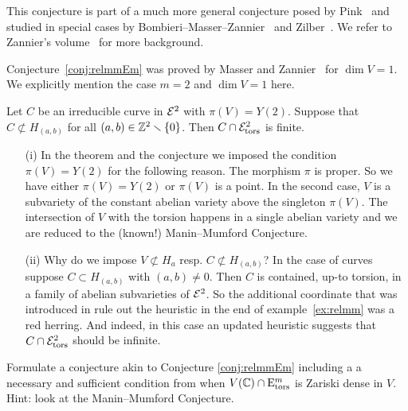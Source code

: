 This conjecture is part of a much more general conjecture posed by
Pink~\cite{Pink} and studied in special cases by
Bombieri--Masser--Zannier~\cite{BMZ,BMZgeometric} and
Zilber~\cite{Zilber}. We refer to Zannier's volume~\cite{ZannierBook}
for more background. 

Conjecture~\ref{conj:relmmEm} was proved by Masser and
Zannier~\cite{MZ:AJM10} for $\dim V = 1$. We explicitly mention the
case $m=2$ and $\dim V=1$ here.

\begin{theorem}
  Let $C$ be an irreducible curve in ${\mathcal E}^2$ with $\pi(V)=Y(2)$. 
  Suppose that $C\not\subset H_{(a,b)}$ for all
  $(a,b)\in{\mathbb{Z}}^2\smallsetminus\{0\}$. Then $C\cap {\mathcal E}^2_{\mathrm{tors}}$ is
  finite. 
\end{theorem}

\begin{remark}
  \begin{enumerate}
  \item [(i)]In the theorem and the conjecture we imposed the condition
    $\pi(V)=Y(2)$ for the following reason. The morphism $\pi$ is proper.
    So we  have either $\pi(V)=Y(2)$ or $\pi(V)$ is a point. In the second
    case, $V$ is a subvariety of the constant abelian variety above the
    singleton $\pi(V)$. The intersection of $V$ with the torsion happens
    in a single abelian variety and we  are reduced to the (known!)
    Manin--Mumford  Conjecture. 
  \item[(ii)] Why do we impose $V\not\subset H_a$ resp. $C\not\subset
    H_{(a,b)}$? In the case of curves suppose  $C\subset H_{(a,b)}$ with
    $(a,b)\not=0$.
    Then $C$ is contained, up-to torsion, in
    a family of abelian subvarieties of ${\mathcal E}^2$. So the additional
    coordinate that was introduced in rule out the heuristic in the
    end of example~\ref{ex:relmm} was a red herring. And indeed, in this case
    an updated heuristic  suggests that  $C\cap
    {\mathcal E}^2_{\mathrm{tors}}$ should be infinite. 
  \end{enumerate} 
\end{remark}


\begin{exercise} 
  Formulate a conjecture akin to Conjecture \ref{conj:relmmEm} including a
  a necessary and  sufficient condition from when $V({\mathbb{C}})\cap
  \mathrm{E}^m_{\mathrm{tors}}$ is Zariski dense in $V$. Hint: look at
  the Manin--Mumford Conjecture. 
\end{exercise}

